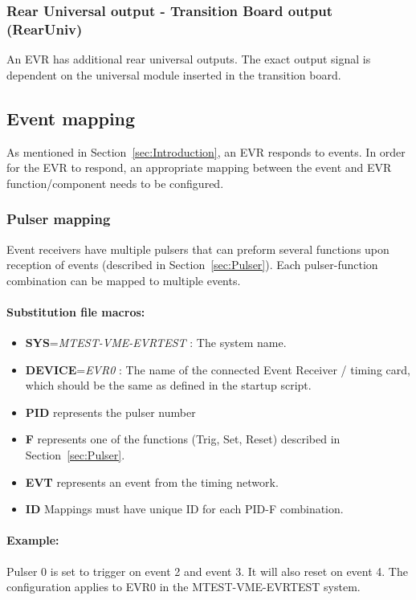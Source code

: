 \documentclass[12pt,a4paper]{article}
\begin{document}
\subsubsection{Rear Universal output - Transition Board output (RearUniv)}\label{sec:Rear Universal output}
An EVR has additional rear universal outputs. The exact output signal is dependent on the universal module inserted in the transition board.

\subsection{Event mapping}\label{sec:Event mapping}
As mentioned in Section~\ref{sec:Introduction}, an EVR responds to events. In order for the EVR to respond, an appropriate mapping between the event and  EVR function/component needs to be configured.

\subsubsection{Pulser mapping}\label{sec:Pulser mapping}
Event receivers have multiple pulsers that can preform several functions upon reception of events (described in Section~\ref{sec:Pulser}). Each pulser-function combination can be
mapped to multiple events.

\paragraph{Substitution file macros:}
\begin{itemize}
\item
	\textbf{SYS}=\emph{MTEST-VME-EVRTEST} : The system name. 
\item
	\textbf{DEVICE}=\emph{EVR0} : The name of the connected Event Receiver / timing card, which should be the same as defined in the startup script.
\item
  \textbf{PID} represents the pulser number
\item
  \textbf{F} represents one of the functions (Trig, Set, Reset) described in Section~\ref{sec:Pulser}.
\item
  \textbf{EVT} represents an event from the timing network.
\item
  \textbf{ID} Mappings must have unique ID for each PID-F combination.
\end{itemize}

\paragraph{Example:} Pulser 0 is set to trigger on event 2 and event 3. It will also
reset on event 4. The configuration applies to EVR0 in the MTEST-VME-EVRTEST system.
\end{document}
